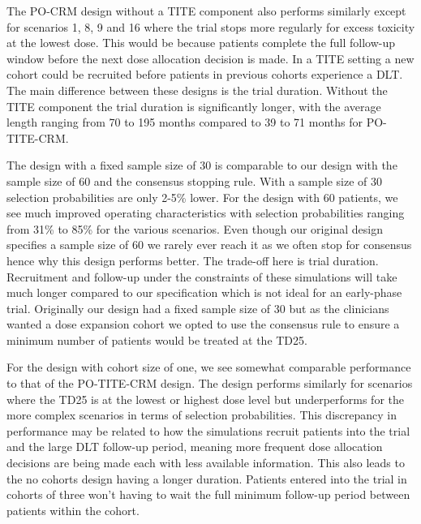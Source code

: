 The PO-CRM design without a TITE component also performs similarly except for scenarios 1, 8, 9 and 16 where the trial stops more regularly for excess toxicity at the lowest dose. This would be because patients complete the full follow-up window before the next dose allocation decision is made. In a TITE setting a new cohort could be recruited before patients in previous cohorts experience a DLT. The main difference between these designs is the trial duration. Without the TITE component the trial duration is significantly longer, with the average length ranging from 70 to 195 months compared to 39 to 71 months for PO-TITE-CRM. 

The design with a fixed sample size of 30 is comparable to our design with the sample size of 60 and the consensus stopping rule. With a sample size of 30 selection probabilities are only 2-5\% lower. For the design with 60 patients, we see much improved operating characteristics with selection probabilities ranging from 31\% to 85\% for the various scenarios. Even though our original design specifies a sample size of 60 we rarely ever reach it as we often stop for consensus hence why this design performs better. The trade-off here is trial duration. Recruitment and follow-up under the constraints of these simulations will take much longer compared to our specification which is not ideal for an early-phase trial. Originally our design had a fixed sample size of 30 but as the clinicians wanted a dose expansion cohort we opted to use the consensus rule to ensure a minimum number of patients would be treated at the TD25. 

For the design with cohort size of one, we see somewhat comparable performance to that of the PO-TITE-CRM design. The design performs similarly for scenarios where the TD25 is at the lowest or highest dose level but underperforms for the more complex scenarios in terms of selection probabilities. This discrepancy in performance may be related to how the simulations recruit patients into the trial and the large DLT follow-up period, meaning more frequent dose allocation decisions are being made each with less available information. This also leads to the no cohorts design having a longer duration. Patients entered into the trial in cohorts of three won't having to wait the full minimum follow-up period between patients within the cohort.




